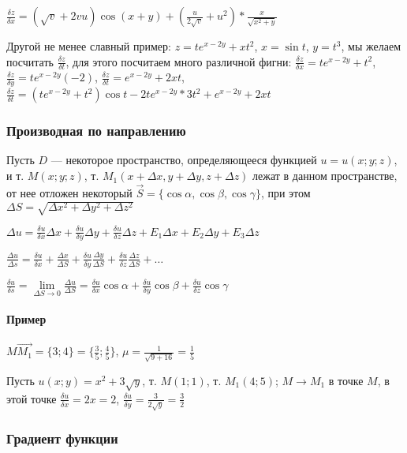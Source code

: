 \documentclass{article}
\begin{document}
$\frac{\delta z}{\delta x} = (\sqrt{v} + 2 v u) \cos (x + y) + (\frac{u}{2\sqrt{v}} + u^2) * \frac{x}{\sqrt{x^2 + y}}$

\hfill

Другой не менее славный пример: $z = t e^{x - 2y} + x t^2$, $x = \sin t$, $y = t^3$, мы желаем посчитать $\frac{\delta z}{\delta t}$, для этого посчитаем много различной фигни: $\frac{\delta z}{\delta x} = t e^{x - 2y} + t^2$, $\frac{\delta z}{\delta y} = t e^{x - 2y} (-2)$, $\frac{\delta z}{\delta t} = e^{x - 2y} + 2 x t$, $\frac{\delta z}{\delta t} = (t e^{x - 2y} + t^2) \cos t - 2 t e^{x - 2 y} * 3t^2 + e^{x -2 y} + 2 xt$

\subsubsection{Производная по направлению}

Пусть $D$ — некоторое пространство, определяющееся функцией $u = u(x; y; z)$, и т. $M(x; y; z)$, т. $M_1(x + \Delta x, y + \Delta y, z + \Delta z)$ лежат в данном пространстве, от нее отложен некоторый $\vec{S} = \{ \cos \alpha, \cos \beta, \cos \gamma \}$, при этом $\Delta S = \sqrt{\Delta x^2 + \Delta y^2 + \Delta z^2}$

$\Delta u = \frac{\delta u}{\delta x} \Delta x + \frac{\delta u}{\delta y} \Delta y + \frac{\delta u}{\delta z} \Delta z + E_1 \Delta x + E_2 \Delta y + E_3 \Delta z$

$\frac{\Delta u}{\Delta s} = \frac{\delta u}{\delta x} + \frac{\Delta x}{\Delta S} + \frac{\delta u}{\delta y} \frac{\Delta y}{\Delta S} + \frac{\delta u}{\delta z} \frac{\Delta z}{\Delta S} + \dots$

$\frac{\delta u}{\delta s} = \lim\limits_{\Delta S \to 0} \frac{\Delta u}{\Delta S} = \frac{\delta u}{\delta x} \cos \alpha + \frac{\delta u}{\delta y} \cos \beta + \frac{\delta u}{\delta z} \cos \gamma$

\paragraph{Пример} $M \vec{M_1} = \{ 3; 4 \} = \{\frac{3}{5}; \frac{4}{5} \}$, $\mu = \frac{1}{\sqrt{9 + 16}} = \frac{1}{5}$

Пусть $u(x; y) = x^2 + 3\sqrt{y}$, т. $M(1; 1)$, т. $M_1(4; 5)$; $M \to M_1$ в точке $M$, в этой точке $\frac{\delta u}{\delta x} = 2x = 2$, $\frac{\delta u}{\delta y} = \frac{3}{2\sqrt{y}} = \frac{3}{2}$

\subsubsection{Градиент функции}
\end{document}
